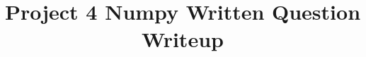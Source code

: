 %
%
%
%
%
%
%
%
%
%
%
%
%

\documentclass[11pt]{article}

\usepackage[english]{babel}
\usepackage[utf8]{inputenc}
\usepackage[colorlinks = true,
            linkcolor = blue,
            urlcolor  = blue]{hyperref}
\usepackage[a4paper,margin=1.5in]{geometry}
\usepackage{stackengine,graphicx}
\usepackage{fancyhdr}
\setlength{\headheight}{15pt}
\usepackage{microtype}
\usepackage{times}
\usepackage{booktabs}

\usepackage{pythonhighlight}

\frenchspacing
\setlength{\parindent}{0cm} %
\setlength{\parskip}{0.3cm plus1mm minus1mm}

\pagestyle{fancy}
\fancyhf{}
\rfoot{\thepage}

\date{}

\title{\vspace{-1cm}Project 4 Numpy Written Question Writeup}



\maketitle
\vspace{-2cm}
\thispagestyle{fancy}

